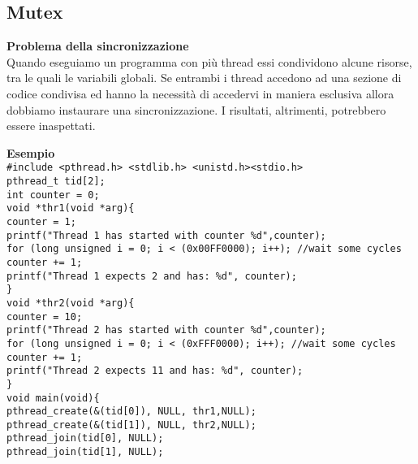 \subsection{Mutex}
\begin{flushleft}
  \textbf{Problema della sincronizzazione}\\
  Quando eseguiamo un programma con più thread essi condividono alcune risorse, tra 
  le quali le variabili globali. Se entrambi i thread accedono ad una sezione di codice 
  condivisa ed hanno la necessità di accedervi in maniera esclusiva allora dobbiamo 
  instaurare una sincronizzazione. I risultati, altrimenti, potrebbero essere inaspettati.
  \begin{flushleft}
    \textbf{Esempio}\\
    \texttt{\#include <pthread.h> <stdlib.h> <unistd.h><stdio.h> \\
    pthread\_t tid[2]; \\
    int counter = 0;\\
    void *thr1(void *arg)\{\\
    \halftab counter = 1;\\
    \halftab printf("Thread 1 has started with counter \%d\n",counter);\\
    \halftab for (long unsigned i = 0; i < (0x00FF0000); i++); //wait some cycles\\
    \halftab counter += 1;\\
    \halftab printf("Thread 1 expects 2 and has: \%d\n", counter);\\
    \} \\
    void *thr2(void *arg)\{\\
    \halftab counter = 10;\\
    \halftab printf("Thread 2 has started with counter \%d\n",counter);\\
    \halftab for (long unsigned i = 0; i < (0xFFF0000); i++); //wait some cycles\\
    \halftab counter += 1;\\
    \halftab printf("Thread 2 expects 11 and has: \%d\n", counter);\\
    \}\\
    void main(void)\{ \\
    \halftab pthread\_create(\&(tid[0]), NULL, thr1,NULL);\\
    \halftab pthread\_create(\&(tid[1]), NULL, thr2,NULL);\\
    \halftab pthread\_join(tid[0], NULL);\\
    \halftab pthread\_join(tid[1], NULL);\\
}
\end{flushleft}
\end{flushleft}
